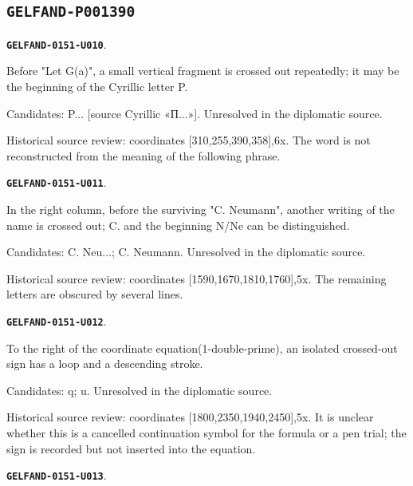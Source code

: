 \documentclass[11pt]{article}
\theoremstyle{definition}
\theoremstyle{remark}
\begin{document}
\subsection*{\texttt{GELFAND-P001390}}
\par\noindent\leavevmode{}\label{GELFAND-0151-U010}\label{GELFAND-P001390:cancelled-let:note}\textbf{\texttt{GELFAND-0151-U010}}.\nopagebreak[4]\par
Before "Let G(a)", a small vertical fragment is crossed out repeatedly; it may be the beginning of the Cyrillic letter P.\par
Candidates: P... [source Cyrillic «П...»]. Unresolved in the diplomatic source.\par
Historical source review: coordinates [310,255,390,358],6x. The word is not reconstructed from the meaning of the following phrase.\par\medskip
\par\noindent\leavevmode{}\label{GELFAND-0151-U011}\label{GELFAND-P001390:cancelled-neumann:note}\textbf{\texttt{GELFAND-0151-U011}}.\nopagebreak[4]\par
In the right column, before the surviving "C. Neumann", another writing of the name is crossed out; C. and the beginning N/Ne can be distinguished.\par
Candidates: C. Neu...; C. Neumann. Unresolved in the diplomatic source.\par
Historical source review: coordinates [1590,1670,1810,1760],5x. The remaining letters are obscured by several lines.\par\medskip
\par\noindent\leavevmode{}\label{GELFAND-0151-U012}\label{GELFAND-P001390:equation-end:note}\textbf{\texttt{GELFAND-0151-U012}}.\nopagebreak[4]\par
To the right of the coordinate equation(1-double-prime), an isolated crossed-out sign has a loop and a descending stroke.\par
Candidates: q; u. Unresolved in the diplomatic source.\par
Historical source review: coordinates [1800,2350,1940,2450],5x. It is unclear whether this is a cancelled continuation symbol for the formula or a pen trial; the sign is recorded but not inserted into the equation.\par\medskip
\par\noindent\leavevmode{}\label{GELFAND-0151-U013}\label{GELFAND-P001390:constants-note:note}\textbf{\texttt{GELFAND-0151-U013}}.\nopagebreak[4]\par
\end{document}
